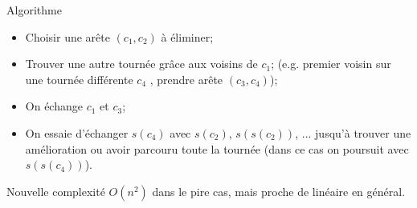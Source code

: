 \documentclass{beamer}
\begin{document}
\begin{frame}
\begin{exampleblock}{Algorithme}
\begin{itemize}
\item Choisir une arête $(c_1,c_2)$ à éliminer;
\item Trouver une autre tournée grâce aux voisins de $c_1$; (e.g. premier voisin sur une tournée différente $c_4$ , prendre arête $(c_3,c_4)$);
\item On échange $c_1$ et $c_3$;
\item On essaie d'échanger $s(c_4)$ avec $s(c_2)$, $s(s(c_2))$, ... jusqu'à trouver une amélioration ou avoir parcouru toute la tournée (dans ce cas on poursuit avec $s(s(c_4))$).
\end{itemize}
\end{exampleblock}

\begin{alertblock}{Nouvelle complexité}
$O(n^2)$ dans le pire cas, mais proche de linéaire en général.
\end{alertblock}
\end{frame}
\end{document}
